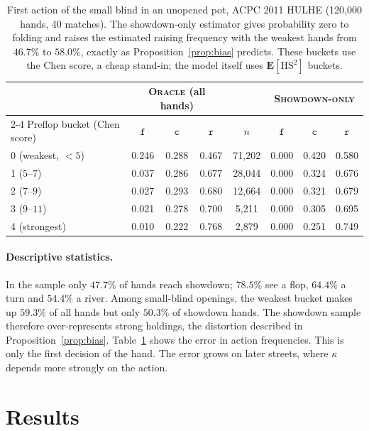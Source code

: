 \documentclass[11pt,a4paper]{article}
\newcommand{\1}{\mathbf{1}}
\begin{document}
\begin{table}[t]
\centering\small
\begin{tabular}{@{}lccccccc@{}}
\toprule
& \multicolumn{3}{c}{\textsc{Oracle} (all hands)} & & \multicolumn{3}{c}{\textsc{Showdown-only}}\\
\cmidrule{2-4}\cmidrule{6-8}
Preflop bucket (Chen score) & $\mathtt{f}$ & $\mathtt{c}$ & $\mathtt{r}$ & $n$ & $\mathtt{f}$ & $\mathtt{c}$ & $\mathtt{r}$\\
\midrule
0 (weakest, $<5$) & 0.246 & 0.288 & 0.467 & 71{,}202 & 0.000 & 0.420 & 0.580\\
1 ($5$--$7$)      & 0.037 & 0.286 & 0.677 & 28{,}044 & 0.000 & 0.324 & 0.676\\
2 ($7$--$9$)      & 0.027 & 0.293 & 0.680 & 12{,}664 & 0.000 & 0.321 & 0.679\\
3 ($9$--$11$)     & 0.021 & 0.278 & 0.700 & 5{,}211  & 0.000 & 0.305 & 0.695\\
4 (strongest)     & 0.010 & 0.222 & 0.768 & 2{,}879  & 0.000 & 0.251 & 0.749\\
\bottomrule
\end{tabular}
\caption{First action of the small blind in an unopened pot, ACPC 2011 HULHE
(120{,}000 hands, 40 matches). The showdown-only estimator gives probability
zero to folding and raises the estimated raising frequency with the weakest
hands from $46.7\%$ to $58.0\%$, exactly as Proposition~\ref{prop:bias}
predicts. These buckets use the Chen score, a cheap stand-in; the model itself
uses $\mathbf{E}[\mathrm{HS}^2]$ buckets.}
\label{tab:bias}
\end{table}

\paragraph{Descriptive statistics.} In the sample only $47.7\%$ of hands reach
showdown; $78.5\%$ see a flop, $64.4\%$ a turn and $54.4\%$ a river. Among
small-blind openings, the weakest bucket makes up $59.3\%$ of all hands but only
$50.3\%$ of showdown hands. The showdown sample therefore over-represents strong
holdings, the distortion described in Proposition~\ref{prop:bias}.
Table~\ref{tab:bias} shows the error in action frequencies. This is only the
first decision of the hand. The error grows on later streets, where $\kappa$
depends more strongly on the action.

\section{Results}\label{sec:results}
\end{document}
